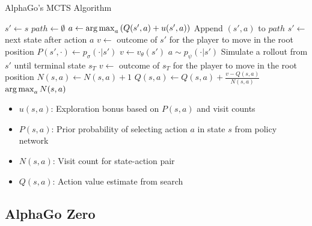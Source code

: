 \documentclass[11pt]{article}
\newcommand{\argmax}{\operatornamewithlimits{arg\,max}}
\begin{document}
\begin{algorithm}
\caption{AlphaGo's MCTS Algorithm}
\begin{algorithmic}[1]
        \State $s' \gets s$ 
        \State $path \gets \emptyset$ 
            \State $a \gets \argmax_a \left( Q(s', a) + u(s', a) \right)$ 
            \State Append $(s', a)$ to $path$
            \State $s' \gets$ next state after action $a$
        \EndWhile
            \State $v \gets$ outcome of $s'$ for the player to move in the root position
            \State $P(s', \cdot) \gets p_\sigma(\cdot | s')$ 
            \State $v \gets v_\theta(s')$ 
        \Else
            \State $a \sim p_\psi(\cdot | s')$ 
            \State Simulate a rollout from $s'$ until terminal state $s_T$
            \State $v \gets$ outcome of $s_T$ for the player to move in the root position
        \EndIf
            \State $N(s, a) \gets N(s, a) + 1$ 
            \State $Q(s, a) \gets Q(s, a) + \frac{v - Q(s, a)}{N(s, a)}$ 
        \EndFor
    \EndFor
    \State \Return $\argmax_a N(s, a)$ 
\EndFunction
\end{algorithmic}
\end{algorithm}

\begin{tcolorbox}[title=Notation Overview]
\begin{itemize}
    \item $u(s, a)$: Exploration bonus based on $P(s, a)$ and visit counts
    \item $P(s, a)$: Prior probability of selecting action $a$ in state $s$ from policy network
    \item $N(s, a)$: Visit count for state-action pair
    \item $Q(s, a)$: Action value estimate from search
\end{itemize}
\end{tcolorbox}

\subsection{AlphaGo Zero}
\end{document}
